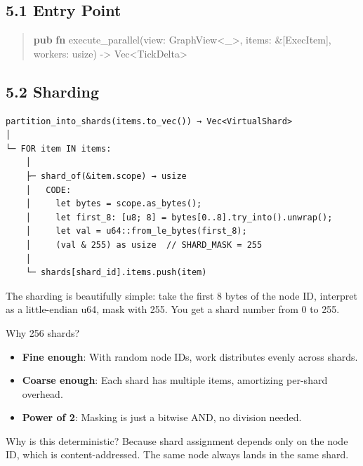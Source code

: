 \documentclass[11pt]{book}
\newenvironment{Shaded}{\begin{quote}}{\end{quote}}
\newcommand{\DataTypeTok}[1]{\textcolor[rgb]{0.56,0.13,0.00}{#1}}
\newcommand{\KeywordTok}[1]{\textcolor[rgb]{0.00,0.44,0.13}{\textbf{#1}}}
\newcommand{\NormalTok}[1]{#1}
\newcommand{\OperatorTok}[1]{\textcolor[rgb]{0.40,0.40,0.40}{#1}}
\newcommand{\OtherTok}[1]{\textcolor[rgb]{0.00,0.44,0.13}{#1}}
\newenvironment{directors}
{\begin{mdframed}[
  linecolor=blue!60,
  linewidth=2pt,
  leftline=true,
  rightline=false,
  topline=false,
  bottomline=false,
  backgroundcolor=blue!3,
  innerleftmargin=12pt,
  innerrightmargin=10pt,
  innertopmargin=8pt,
  innerbottommargin=8pt,
  skipabove=12pt,
  skipbelow=12pt
]\small\sffamily\color{blue!70!black}}
{\end{mdframed}}
\begin{document}
\subsection{5.1 Entry Point}

\begin{Shaded}
\begin{Highlighting}[]
\KeywordTok{pub} \KeywordTok{fn}\NormalTok{ execute\_parallel(view}\OperatorTok{:}\NormalTok{ GraphView}\OperatorTok{\textless{}}\OtherTok{\textquotesingle{}\_}\OperatorTok{\textgreater{},}\NormalTok{ items}\OperatorTok{:} \OperatorTok{\&}\NormalTok{[ExecItem]}\OperatorTok{,}\NormalTok{ workers}\OperatorTok{:} \DataTypeTok{usize}\NormalTok{) }\OperatorTok{{-}\textgreater{}} \DataTypeTok{Vec}\OperatorTok{\textless{}}\NormalTok{TickDelta}\OperatorTok{\textgreater{}}
\end{Highlighting}
\end{Shaded}

\subsection{5.2 Sharding}

\begin{verbatim}
partition_into_shards(items.to_vec()) → Vec<VirtualShard>
│
└─ FOR item IN items:
    │
    ├─ shard_of(&item.scope) → usize
    │   CODE:
    │     let bytes = scope.as_bytes();
    │     let first_8: [u8; 8] = bytes[0..8].try_into().unwrap();
    │     let val = u64::from_le_bytes(first_8);
    │     (val & 255) as usize  // SHARD_MASK = 255
    │
    └─ shards[shard_id].items.push(item)
\end{verbatim}

\begin{directors}
The sharding is beautifully simple: take the first 8 bytes of the node ID, interpret as a little-endian u64, mask with 255. You get a shard number from 0 to 255.

Why 256 shards?
\begin{itemize}
\item \textbf{Fine enough}: With random node IDs, work distributes evenly across shards.
\item \textbf{Coarse enough}: Each shard has multiple items, amortizing per-shard overhead.
\item \textbf{Power of 2}: Masking is just a bitwise AND, no division needed.
\end{itemize}

Why is this deterministic? Because shard assignment depends only on the node ID, which is content-addressed. The same node always lands in the same shard.
\end{directors}
\end{document}
